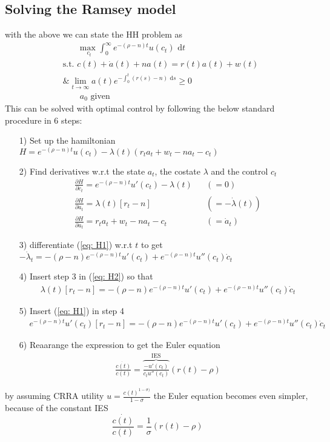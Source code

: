 \documentclass[12pt, a4paper]{article}
\begin{document}
\begin{spacing}{1.213}
\subsection{Solving the Ramsey model}
with the above we can state the HH problem as 
\begin{align*}
&\qquad\underset{c_t}{\textrm{max }} \int_0^{\infty} e^{-(\rho-n) t} u( c_t ) \textrm{ d}t 
\\
&\textrm{s.t.  } c(t) + \dot{a}(t) + n a(t) = r(t)a(t) + w(t) 
\\
&\textrm{\&  }  \lim_{t \rightarrow \infty} a(t) e^{- \int_0^t (r(s)-n) \textrm{ d} s} \geq 0 
\\
& \qquad a_0 \textrm{ given}
\end{align*}
This can be solved with optimal control by following the below standard procedure in 6 steps:
\begin{itemize}
\item[1)] Set up the hamiltonian $H = e^{-(\rho -n)t}u(c_t) - \lambda(t)(r_t a_t + w_t - n a_t - c_t)$
\item[2)] Find derivatives w.r.t the state $a_t$, the costate $\lambda$ and the control $c_t$ 
\begin{align}
&\frac{\partial H}{\partial c_t} = e^{-(\rho -n)t}u'(c_t) - \lambda(t) &&(=0) \label{eq: H1}
\\ 
&\frac{\partial H}{\partial a_t} = \lambda(t)[r_t -n] && (= - \dot{\lambda}(t) ) \label{eq: H2}
\\
& \frac{\partial H}{\partial a_t} = r_t a_t + w_t - n a_t - c_t && (=\dot{a}_t) \label{eq: H3}
\end{align}
\item[3)] differentiate (\ref{eq: H1}) w.r.t $t$ to get $-\dot{\lambda}_t = -(\rho-n)e^{-(\rho -n)t}u'(c_t) +e^{-(\rho -n)t}u''(c_t) \dot{c}_t$
\item[4)] Insert step 3 in (\ref{eq: H2}) so that 
\begin{align*}
&\lambda(t)[r_t -n] = -(\rho-n)e^{-(\rho -n)t}u'(c_t) +e^{-(\rho -n)t}u''(c_t) \dot{c}_t 
\end{align*}
\item[5)] Insert (\ref{eq: H1}) in step 4
\begin{align*}
&e^{-(\rho -n)t}u'(c_t)[r_t -n] = -(\rho-n)e^{-(\rho -n)t}u'(c_t) +e^{-(\rho -n)t}u''(c_t) \dot{c}_t 
\end{align*}
\item[6)] Reaarange the expression to get the Euler equation
\begin{align*}
& \frac{\dot{c(t)}}{c(t)} = \overbrace{\frac{-u'(c_t)}{c_t u''(c_t)}}^{\textrm{IES}}(r(t) - \rho)
\end{align*}
\end{itemize}
by assuming CRRA utility $u = \frac{c(t)^{1-\sigma)}}{1-\sigma}$ the Euler equation becomes even simpler, because of the constant IES 
\begin{equation}
\frac{\dot{c(t)}}{c(t)} = \frac{1}{\sigma}(r(t) - \rho)
\end{equation}


\end{spacing}
\end{document}
